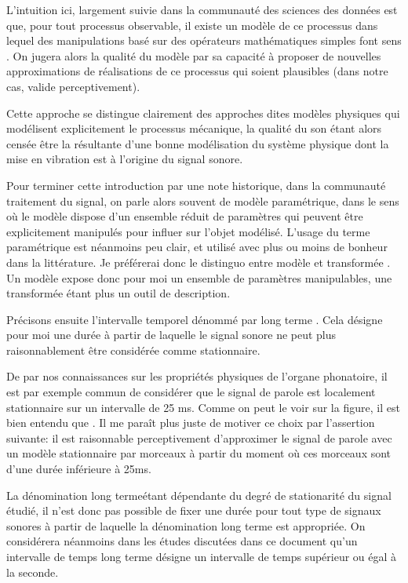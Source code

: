 L'intuition ici, largement suivie dans la communauté des sciences des données est que, pour tout processus observable, il existe un modèle de ce processus dans lequel des manipulations basé sur des opérateurs mathématiques simples \og font sens \fg. On jugera alors la qualité du modèle par sa capacité à proposer de nouvelles approximations de réalisations de ce processus qui soient plausibles (dans notre cas, valide perceptivement).

Cette approche se distingue clairement des approches dites \og modèles physiques \fg qui modélisent explicitement le processus mécanique, la qualité du son étant alors censée être la résultante d'une bonne modélisation du système physique dont la mise en vibration est à l'origine du signal sonore.

Pour terminer cette introduction par une note historique, dans la communauté traitement du signal, on parle alors souvent de modèle paramétrique, dans le sens où le modèle dispose d'un ensemble réduit de paramètres qui peuvent être explicitement manipulés pour influer sur l'objet modélisé. L'usage du terme \og paramétrique \fg est néanmoins peu clair, et utilisé avec plus ou moins de bonheur dans la littérature. Je préférerai donc le distinguo entre \og modèle \fg et \og transformée \fg. Un modèle expose donc pour moi un ensemble de paramètres manipulables, une transformée étant plus un outil de description.

Précisons ensuite l'intervalle temporel dénommé par \og long terme \fg. Cela désigne pour moi une durée à partir de laquelle le signal sonore ne peut plus raisonnablement être considérée comme stationnaire.

De par nos connaissances sur les propriétés physiques de l'organe phonatoire, il est par exemple commun de considérer que le signal de parole est localement stationnaire sur un intervalle de 25 ms. Comme on peut le voir sur la figure, il est bien entendu que . Il me paraît plus juste de motiver ce choix par l'assertion suivante: il est raisonnable perceptivement d'approximer le signal de parole avec un modèle stationnaire par morceaux à partir du moment où ces morceaux sont d'une durée inférieure à 25ms.

La dénomination \og long terme\og  étant dépendante du degré de stationarité du signal étudié, il n'est donc pas possible de fixer une durée pour tout type de signaux sonores à partir de laquelle la dénomination \og long terme \fg est appropriée. On considérera néanmoins dans les études discutées dans ce document qu'un intervalle de temps  \og long terme \fg désigne un intervalle de temps supérieur ou égal à la seconde.

